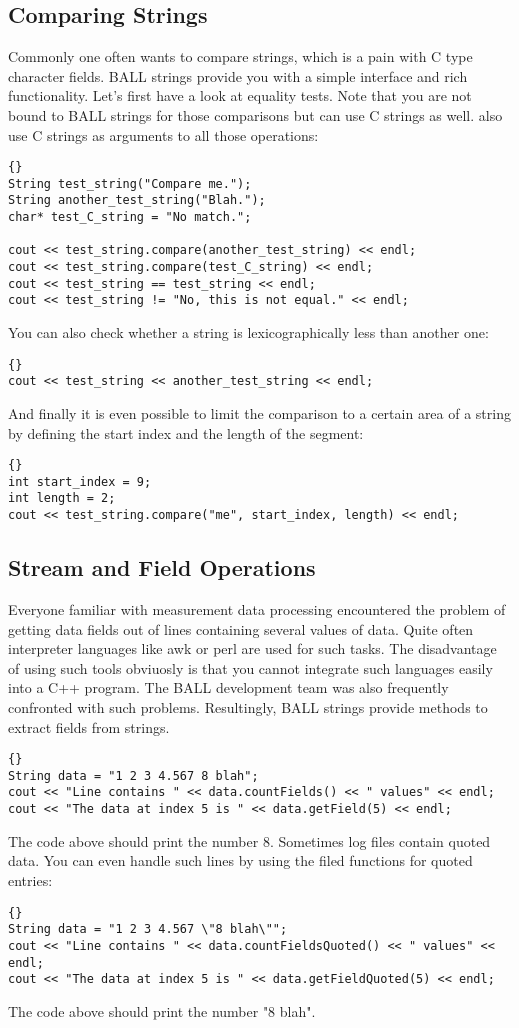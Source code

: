 \subsection{Comparing Strings}

Commonly one often wants to compare strings, which is a pain with C type
character fields. BALL strings provide you with a simple interface and rich
functionality. Let's first have a look at equality tests. Note that you are
not bound to BALL strings for those comparisons but can use C strings as well.
also use C strings as arguments to all those operations:
\begin{lstlisting}{}
String test_string("Compare me.");
String another_test_string("Blah.");
char* test_C_string = "No match.";

cout << test_string.compare(another_test_string) << endl;
cout << test_string.compare(test_C_string) << endl;
cout << test_string == test_string << endl;
cout << test_string != "No, this is not equal." << endl;
\end{lstlisting}
You can also check whether a string is lexicographically less than another
one:
\begin{lstlisting}{}
cout << test_string << another_test_string << endl;
\end{lstlisting}
And finally it is even possible to limit the comparison to a certain area of
a string by defining the start index and the length of the segment:
\begin{lstlisting}{}
int start_index = 9;
int length = 2;
cout << test_string.compare("me", start_index, length) << endl;
\end{lstlisting}

\subsection{Stream and Field Operations}

Everyone familiar with measurement data processing encountered the problem of
getting data fields out of lines containing several values of data. Quite
often interpreter languages like awk or perl are used for such tasks. The
disadvantage of using such tools obviuosly is that you cannot integrate such
languages easily into a C++ program. The BALL development team was also
frequently confronted with such problems. Resultingly, BALL strings provide
methods to extract fields from strings.
\begin{lstlisting}{}
String data = "1 2 3 4.567 8 blah";
cout << "Line contains " << data.countFields() << " values" << endl;
cout << "The data at index 5 is " << data.getField(5) << endl;
\end{lstlisting}
The code above should print the number 8.
Sometimes log files contain quoted data. You can even handle such lines by
using the filed functions for quoted entries:
\begin{lstlisting}{}
String data = "1 2 3 4.567 \"8 blah\"";
cout << "Line contains " << data.countFieldsQuoted() << " values" << endl;
cout << "The data at index 5 is " << data.getFieldQuoted(5) << endl;
\end{lstlisting}
The code above should print the number "8 blah".

